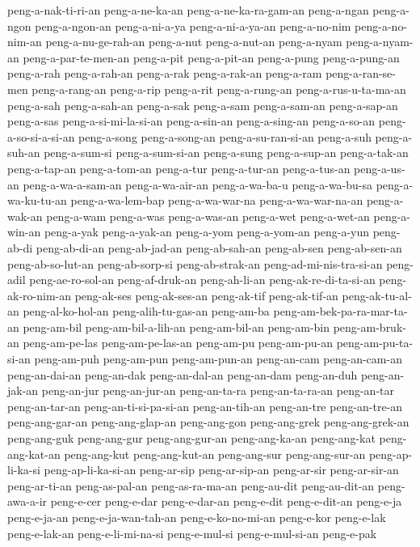 {peng-a-nak-ti-ri-an peng-a-ne-ka-an peng-a-ne-ka-ra-gam-an peng-a-ngan
peng-a-ngon peng-a-ngon-an peng-a-ni-a-ya peng-a-ni-a-ya-an peng-a-no-nim
peng-a-no-nim-an peng-a-nu-ge-rah-an peng-a-nut peng-a-nut-an peng-a-nyam
peng-a-nyam-an peng-a-par-te-men-an peng-a-pit peng-a-pit-an peng-a-pung
peng-a-pung-an peng-a-rah peng-a-rah-an peng-a-rak peng-a-rak-an
peng-a-ram peng-a-ran-se-men peng-a-rang-an peng-a-rip peng-a-rit
peng-a-rung-an peng-a-rus-u-ta-ma-an peng-a-sah peng-a-sah-an peng-a-sak
peng-a-sam peng-a-sam-an peng-a-sap-an peng-a-sas peng-a-si-mi-la-si-an
peng-a-sin-an peng-a-sing-an peng-a-so-an peng-a-so-si-a-si-an peng-a-song
peng-a-song-an peng-a-su-ran-si-an peng-a-suh peng-a-suh-an peng-a-sum-si
peng-a-sum-si-an peng-a-sung peng-a-sup-an peng-a-tak-an peng-a-tap-an
peng-a-tom-an peng-a-tur peng-a-tur-an peng-a-tus-an peng-a-us-an
peng-a-wa-a-sam-an peng-a-wa-air-an peng-a-wa-ba-u peng-a-wa-bu-sa
peng-a-wa-ku-tu-an peng-a-wa-lem-bap peng-a-wa-war-na peng-a-wa-war-na-an
peng-a-wak-an peng-a-wam peng-a-was peng-a-was-an peng-a-wet peng-a-wet-an
peng-a-win-an peng-a-yak peng-a-yak-an peng-a-yom peng-a-yom-an peng-a-yun
peng-ab-di peng-ab-di-an peng-ab-jad-an peng-ab-sah-an peng-ab-sen
peng-ab-sen-an peng-ab-so-lut-an peng-ab-sorp-si peng-ab-strak-an
peng-ad-mi-nis-tra-si-an peng-adil peng-ae-ro-sol-an peng-af-druk-an
peng-ah-li-an peng-ak-re-di-ta-si-an peng-ak-ro-nim-an peng-ak-ses
peng-ak-ses-an peng-ak-tif peng-ak-tif-an peng-ak-tu-al-an
peng-al-ko-hol-an peng-alih-tu-gas-an peng-am-ba
peng-am-bek-pa-ra-mar-ta-an peng-am-bil peng-am-bil-a-lih-an
peng-am-bil-an peng-am-bin peng-am-bruk-an peng-am-pe-las
peng-am-pe-las-an peng-am-pu peng-am-pu-an peng-am-pu-ta-si-an peng-am-puh
peng-am-pun peng-am-pun-an peng-an-cam peng-an-cam-an peng-an-dai-an
peng-an-dak peng-an-dal-an peng-an-dam peng-an-duh peng-an-jak-an
peng-an-jur peng-an-jur-an peng-an-ta-ra peng-an-ta-ra-an peng-an-tar
peng-an-tar-an peng-an-ti-si-pa-si-an peng-an-tih-an peng-an-tre
peng-an-tre-an peng-ang-gar-an peng-ang-glap-an peng-ang-gon peng-ang-grek
peng-ang-grek-an peng-ang-guk peng-ang-gur peng-ang-gur-an peng-ang-ka-an
peng-ang-kat peng-ang-kat-an peng-ang-kut peng-ang-kut-an peng-ang-sur
peng-ang-sur-an peng-ap-li-ka-si peng-ap-li-ka-si-an peng-ar-sip
peng-ar-sip-an peng-ar-sir peng-ar-sir-an peng-ar-ti-an peng-as-pal-an
peng-as-ra-ma-an peng-au-dit peng-au-dit-an peng-awa-a-ir peng-e-cer
peng-e-dar peng-e-dar-an peng-e-dit peng-e-dit-an peng-e-ja peng-e-ja-an
peng-e-ja-wan-tah-an peng-e-ko-no-mi-an peng-e-kor peng-e-lak
peng-e-lak-an peng-e-li-mi-na-si peng-e-mul-si peng-e-mul-si-an peng-e-pak
}
